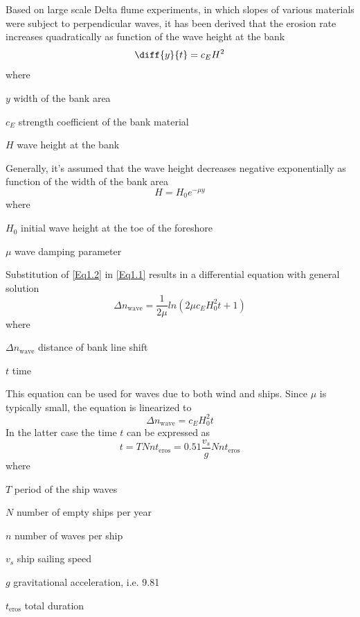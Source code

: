 Based on large scale Delta flume experiments, in which slopes of various materials were subject to perpendicular waves, it has been derived that the erosion rate increases quadratically as function of the wave height at the bank
%
\begin{equation}
\diff{y}{t} = c_E H^2
\label{Eq1.1}
\end{equation}
%
where
%
\begin{symbollist}
\item[$y$] width of the bank area 
\item[$c_E$] strength coefficient of the bank material 
\item[$H$] wave height at the bank 
\end{symbollist}
%
Generally, it's assumed that the wave height decreases negative exponentially as function of the width of the bank area
%
\begin{equation}
H = H_0 e^{-\mu y}
\label{Eq1.2}
\end{equation}
%
where
%
\begin{symbollist}
\item[$H_0$] initial wave height at the toe of the foreshore 
\item[$\mu$] wave damping parameter 
\end{symbollist}
%
Substitution of \autoref{Eq1.2} in \autoref{Eq1.1} results in a differential equation with general solution
%
\begin{equation}
\Delta n_\text{wave} = \frac{1}{2 \mu} ln ( 2 \mu c_E H_0^2 t + 1 )
\end{equation}
%
where
%
\begin{symbollist}
\item[$\Delta n_\text{wave}$] distance of bank line shift 
\item[$t$] time 
\end{symbollist}
%
This equation can be used for waves due to both wind and ships.
Since $\mu$ is typically small, the equation is linearized to
%
\begin{equation}
\Delta n_\text{wave} = c_E H_0^2 t
\end{equation}
%
In the latter case the time $t$ can be expressed as
%
\begin{equation}
t = T N n t_\text{eros} = 0.51 \frac{v_s}{g} N n t_\text{eros}
\end{equation}
%
where
%
\begin{symbollist}
\item[$T$] period of the ship waves 
\item[$N$] number of empty ships per year \unitbrackets{-}
\item[$n$] number of waves per ship \unitbrackets{-}
\item[$v_s$] ship sailing speed 
\item[$g$] gravitational acceleration, i.e. 9.81 
\item[$t_\text{eros}$] total duration 
\end{symbollist}
